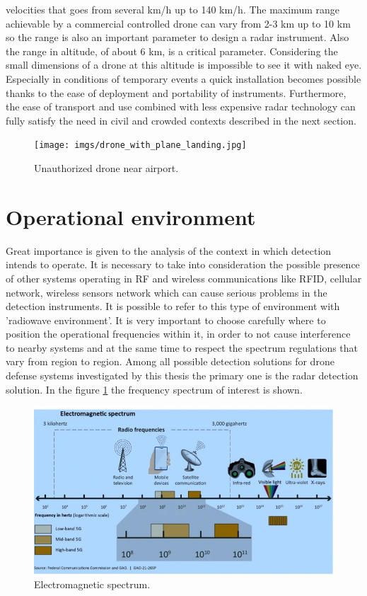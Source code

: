 velocities that goes from several km/h up to 140 km/h. %
The maximum range achievable by a commercial controlled drone can vary from 2-3 km up to 10 km so the range is also an important parameter to design a radar instrument. Also the range in altitude, of about 6 km, is a critical parameter. Considering the small dimensions of a drone at this altitude is impossible to see it with naked eye. Especially in conditions of temporary events a quick installation becomes possible thanks to the ease of deployment and portability of instruments. Furthermore, the ease of transport and use combined with less expensive radar technology can fully satisfy the need in civil and crowded contexts described in the next section. 

\begin{figure}[h!]
    \centering
    \texttt{[image: imgs/drone\_with\_plane\_landing.jpg]}
    \caption{Unauthorized drone near airport.}
\end{figure}




\section{Operational environment}
Great importance is given to the analysis of the context in which detection intends to operate. It is necessary to take into consideration the possible presence of other systems operating in RF and wireless communications like RFID, cellular network, wireless sensors network which can cause serious problems in the detection instruments. It is possible to refer to this type of environment with 'radiowave environment'. It is very important to choose carefully where to position the operational frequencies within it, in order to not cause interference to nearby systems and at the same time to respect the spectrum regulations that vary from region to region. Among all possible detection solutions for drone defense systems investigated by this thesis the primary one is the radar detection solution. In the figure \ref{specrtum} the frequency spectrum of interest is shown.

\begin{figure}[h!]
    \centering
    \includegraphics[width=13cm]{imgs/ElecSpect.jpg}
    \caption{Electromagnetic spectrum.}
    \label{specrtum}
\end{figure}

